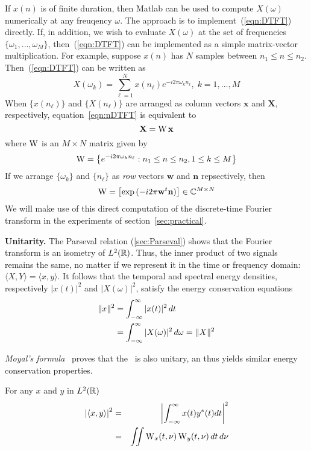 If $x(n)$ is of finite duration, then Matlab can be used to compute
$X(\omega)$ numerically at any freuqency $\omega$.  The approach
is to implement~(\ref{eqn:DTFT}) directly.  If, in addition, we wish to
evaluate $X(\omega)$ at the set of frequencies
$\{\omega_1,\ldots,\omega_M\}$, then~(\ref{eqn:DTFT}) can be
implemented as a simple matrix-vector multiplication.  For example,
suppose $x(n)$ has $N$ samples between $n_1 \leq n \leq n_2$.  
Then~(\ref{eqn:DTFT}) can be written as
\begin{equation}
\label{eqn:nDTFT}
X(\omega_k) = 
\sum_{\ell=1}^{N}x(n_{\ell}) e^{-i2\pi\omega_k n_{\ell}}, \; k = 1, \ldots, M
\end{equation}
When $\{x(n_{\ell})\}$ and $\{X(n_{\ell})\}$ are arranged as
column vectors $\mathbf{x}$ and $\mathbf{X}$, respectively, 
equation~\ref{eqn:nDTFT} is equivalent to 
\[\mathbf{X} = \operatorname{W} \mathbf{x}\]
where $\operatorname{W}$ is an $M \times N$ matrix given by 
\[
\operatorname{W} = 
\left\{e^{-i2\pi\omega_k n_{\ell}} : n_1 \leq n \leq n_2, 1 \leq k \leq M \right\}
\]
If we arrange $\{\omega_k\}$ and $\{n_{\ell}\}$ as \emph{row} vectors
$\mathbf{w}$ and $\mathbf{n}$ repsectively, then 
\[
\operatorname{W} =
\left[\exp{(-i2\pi\mathbf{w}^t \mathbf{n})}\right] \in \mathbb{C}^{M\times N}
\]
We will make use of this direct computation of the discrete-time
Fourier transform in the experiments of section~\ref{sec:practical}.

\begin{define}{\bf Unitarity. }  
The Parseval relation (\ref{sec:Parseval}) shows that the Fourier transform is
an isometry of $L^2(\mathbb{R})$.  Thus, the inner product of two signals remains the
same, no matter if we represent it in the time or frequency domain:
$\langle X,Y\rangle = \langle x,y\rangle$.  
It follows that the temporal and spectral energy densities,
respectively $|x(t)|^2$ and $|X(\omega)|^2$, %
satisfy the energy conservation equations
\begin{align*}
\|x\|^2 &= \int_{-\infty}^{\infty} |x(t)|^2\,dt  \\
        &=\int_{-\infty}^{\infty} |X(\omega)|^2\,d\omega = \|X\|^2
\end{align*}
\end{define}

\emph{Moyal's formula}~\cite{Moyal:1949} proves that the \WT\ is also
  unitary, an thus yields similar energy conservation properties.
\begin{theorem}
For any $x$ and $y$ in $L^2(\mathbb{R})$
\begin{eqnarray}
\left|\langle x,y\rangle\right|^2 &=& 
\left|\integral x(t)y^*(t)dt\right|^2 \nonumber \\
&=&%
\iint \W_x(t,\nu)\W_y(t,\nu) \,dt \,d\nu
\label{eqn:Moyal}
\end{eqnarray}
\end{theorem}

